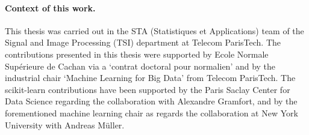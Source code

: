 \paragraph{Context of this work.}
This thesis was carried out in the STA (Statistiques et Applications) team of the Signal and Image Processing (TSI) department at Telecom ParisTech. The contributions presented in this thesis were supported by Ecole Normale Supérieure de Cachan via a `contrat doctoral pour normalien' and by the industrial chair `Machine Learning for Big Data' from Telecom ParisTech. The scikit-learn contributions have been supported by the Paris Saclay Center for Data Science regarding the collaboration with Alexandre Gramfort, and by the forementioned machine learning chair as regards the collaboration at New York University with Andreas Müller.

